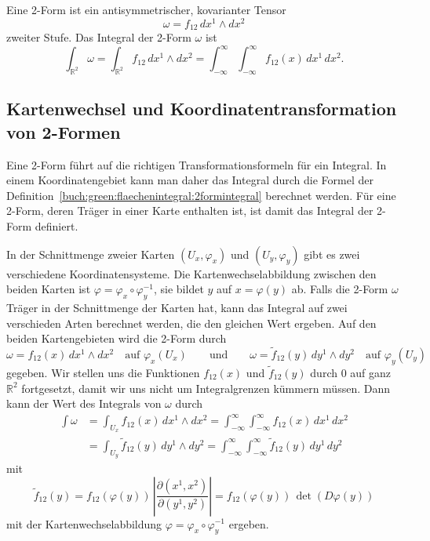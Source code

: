 \begin{definition}
\label{buch:green:flaechenintegral:2formintegral}
Eine 2-Form ist ein antisymmetrischer, kovarianter Tensor
\[
\omega
=
f_{12}\, dx^1\wedge dx^2
\]
zweiter Stufe.
Das Integral der 2-Form $\omega$ ist
\[
\int_{\mathbb{R}^2}
\omega
=
\int_{\mathbb{R}^2}
f_{12}\, dx^1\wedge dx^2
=
\int_{-\infty}^\infty
\int_{-\infty}^\infty
f_{12}(x)
\,
dx^1\,dx^2.
\]
\end{definition}

%
%
\subsection{Kartenwechsel und Koordinatentransformation von 2-Formen}
Eine 2-Form führt auf die richtigen Transformationsformeln für ein Integral.
In einem Koordinatengebiet kann man daher das Integral durch die Formel
der Definition~\ref{buch:green:flaechenintegral:2formintegral}
berechnet werden.
Für eine 2-Form, deren Träger in einer Karte enthalten ist, ist
damit das Integral der 2-Form definiert.

In der Schnittmenge zweier Karten $(U_x,\varphi_x)$ und $(U_y,\varphi_y)$
gibt es zwei verschiedene Koordinatensysteme.
Die Kartenwechselabbildung zwischen den beiden Karten ist
$\varphi=\varphi_x\circ\varphi_y^{-1}$, sie bildet $y$ auf
$x=\varphi(y)$ ab.
Falls die 2-Form $\omega$ Träger in der Schnittmenge der Karten hat,
kann das Integral auf zwei verschieden Arten berechnet werden,
die den gleichen Wert ergeben.
Auf den beiden Kartengebieten wird die 2-Form durch
\[
\omega
=
f_{12}(x)\,dx^1\wedge dx^2\quad\text{auf $\varphi_x(U_x)$}
\qquad\text{und}\qquad
\omega
=
\tilde{f}_{12}(y)\,dy^1\wedge dy^2\quad\text{auf $\varphi_y(U_y)$}
\]
gegeben.
Wir stellen uns die Funktionen $f_{12}(x)$ und $\tilde{f}_{12}(y)$
durch 0 auf ganz $\mathbb{R}^2$ fortgesetzt, damit wir uns nicht um
Integralgrenzen kümmern müssen.
Dann kann der Wert des Integrals von $\omega$ durch
\begin{align*}
\int \omega
&=
\int_{U_x} f_{12}(x) \,dx^1\wedge dx^2
=
\int_{-\infty}^\infty\int_{-\infty}^\infty f_{12}(x)\,dx^1\,dx^2
\\
&=
\int_{U_y} \tilde{f}_{12}(y) \,dy^1\wedge dy^2
=
\int_{-\infty}^\infty\int_{-\infty}^\infty \tilde{f}_{12}(y)\,dy^1\,dy^2
\end{align*}
mit
\[
\tilde{f}_{12}(y)
=
f_{12}(\varphi(y))
\,
\left|
\frac{\partial(x^1,x^2)}{\partial(y^1,y^2)}
\right|
=
f_{12}(\varphi(y))
\,
\det(D\varphi(y))
\]
mit der Kartenwechselabbildung $\varphi=\varphi_x\circ\varphi_y^{-1}$
ergeben.

